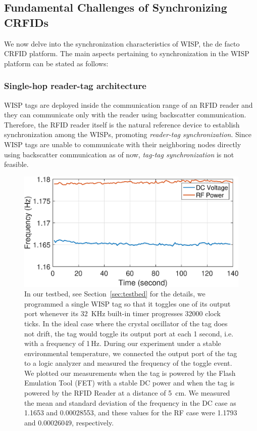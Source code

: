 \documentclass[10pt,journal,compsoc]{IEEEtran}
\begin{document}
\subsection{Fundamental Challenges of Synchronizing CRFIDs}
\label{sec:CRFIDs}

We now delve into the synchronization characteristics of WISP, the de facto CRFID platform. The main aspects pertaining to synchronization in the WISP platform can be stated as follows:

\subsubsection{Single-hop reader-tag architecture} WISP tags are deployed inside the communication range of an RFID reader and they can communicate only with the reader using backscatter communication. Therefore, the RFID reader itself is the natural reference device to establish synchronization among the WISPs, promoting \emph{reader-tag synchronization}. Since WISP tags are unable to communicate with their neighboring nodes directly using backscatter communication as of now, \emph{tag-tag synchronization} is not feasible.

\begin{figure}
	\centering
	\includegraphics[width=0.85\columnwidth]{figures/clock_frequency_dc_rf.eps}
	\caption{\label{fig:frequency_dc_rf} In our testbed, see Section~\ref{sec:testbed} for the details, we programmed a single WISP tag so that it toggles one of its output port whenever its 32~KHz built-in timer progresses 32000 clock ticks. In the ideal case where the crystal oscillator of the tag does not drift, the tag would toggle its output port at each 1 second, i.e. with a frequency of 1\,Hz. During our experiment under a stable environmental temperature, we connected the output port of the tag to a logic analyzer and measured the frequency of the toggle event. We plotted our measurements when the tag is powered by the Flash Emulation Tool (FET) with a stable DC power and when the tag is powered by the RFID Reader at a distance of 5~cm. We measured the mean and standard deviation of the frequency in the DC case as 1.1653 and 0.00028553, and these values for the RF case were 1.1793 and 0.00026049, respectively. }
\end{figure}
\end{document}
